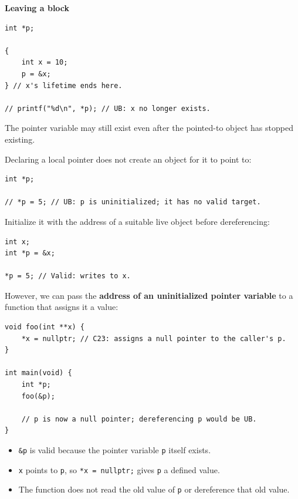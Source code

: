 \documentclass[11pt,a4paper]{article}
\begin{document}
\textbf{Leaving a block}

\begin{lstlisting}[style=cscode]
int *p;

{
    int x = 10;
    p = &x;
} // x's lifetime ends here.

// printf("%d\n", *p); // UB: x no longer exists.
\end{lstlisting}

The pointer variable may still exist even after the pointed-to
object has stopped existing.


Declaring a local pointer does not create an object for it to
point to:

\begin{lstlisting}[style=cscode]
int *p;

// *p = 5; // UB: p is uninitialized; it has no valid target.
\end{lstlisting}

Initialize it with the address of a suitable live object before
dereferencing:

\begin{lstlisting}[style=cscode]
int x;
int *p = &x;

*p = 5; // Valid: writes to x.
\end{lstlisting}

However, we can pass the
\textbf{address of an uninitialized pointer variable}
to a function that assigns it a value:

\begin{lstlisting}[style=cscode]
void foo(int **x) {
    *x = nullptr; // C23: assigns a null pointer to the caller's p.
}

int main(void) {
    int *p;
    foo(&p);

    // p is now a null pointer; dereferencing p would be UB.
}
\end{lstlisting}

\begin{itemize}
    \item \texttt{\&p} is valid because the pointer variable
          \texttt{p} itself exists.
    \item \texttt{x} points to \texttt{p}, so
          \texttt{*x = nullptr;} gives \texttt{p} a defined value.
    \item The function does not read the old value of
          \texttt{p} or dereference that old value.
\end{itemize}
\end{document}
